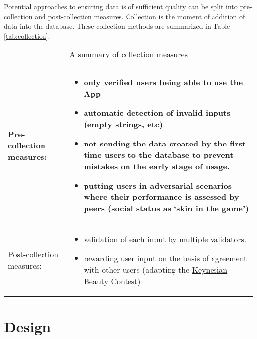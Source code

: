 \documentclass{article}
\begin{document}
Potential approaches to ensuring data is of sufficient quality can be split into pre-collection and post-collection measures. Collection is the moment of addition of data into the database. These collection methods are summarized in Table \ref{tab:collection}.

  \begin{table}[h!]
      \centering
    \begin{tabular}{|l|p{4cm}|}
\toprule
Pre-collection measures:  & \begin{itemize}[left=0pt,topsep=0pt]\item only verified users being able to use the App
  \item automatic detection of invalid inputs (empty strings, etc)
  \item not sending the data created by the first time users to the database to prevent mistakes on the early stage of usage.
  \item putting users in adversarial scenarios where their performance is assessed by peers (social status as \href{https://dictionary.cambridge.org/dictionary/english/have-skin-in-the-game}{`skin in the game'})
\end{itemize} \\
\midrule
       Post-collection measures:  & \begin{itemize}[left=0pt,topsep=0pt]
  \item validation of each input by multiple validators.  
  \item rewarding user input on the basis of agreement with other users (adapting the \href{https://en.wikipedia.org/wiki/Keynesian_beauty_contest}{Keynesian Beauty Contest}\cite{Keynes1936})
\end{itemize} \\
\bottomrule
    \end{tabular}
    \caption{A summary of collection measures}

 \end{table}\label{tab:collection}

\newpage

\chapter{Design}
\end{document}

